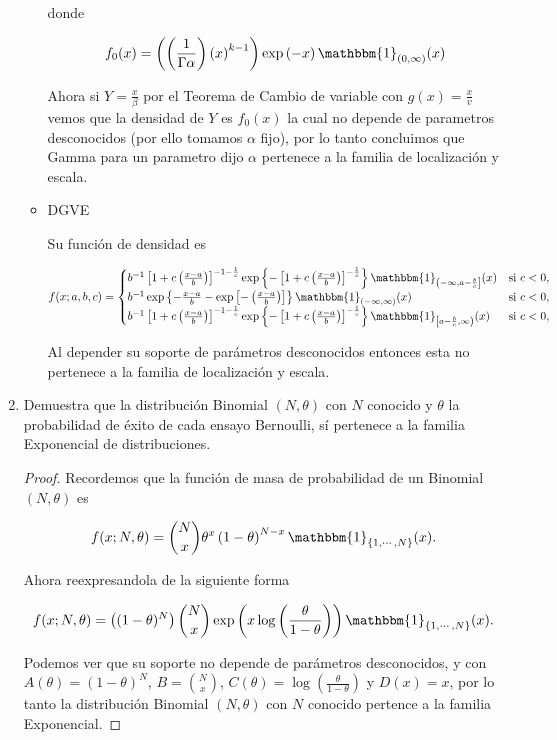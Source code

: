 \documentclass[letterpaper]{article}
\theoremstyle{definition}
\theoremstyle{lemathm}
\theoremstyle{lemathm}
\theoremstyle{lemathm}
\theoremstyle{lemademthm}
\newcommand{\pars}[1]{\left( #1 \right) }
\newcommand{\bracs}[1]{\left[ #1 \right] }
\newcommand{\set}[1]{\left \{ #1 \right\} }
\newcommand{\1}{\mathbbm{1}}
\begin{document}
\begin{enumerate}
\begin{itemize}
			donde

			\[f_0(x) = \pars{\pars{\frac{1}{\Gamma{\alpha}}}\pars{x}^{k-1}} \exp\pars{-x} \1_{(0,\infty)}(x)\]

			Ahora si $Y = \frac{x}{\beta}$ por el Teorema de Cambio de variable con $g(x) = \frac{x}{v}$ vemos que la densidad de $Y$ es $f_0(x)$ la cual no depende de parametros desconocidos (por ello tomamos $\alpha$ fijo), por lo tanto concluimos que Gamma para un parametro dijo $\alpha$ pertenece a la familia de localización y escala.

			\item DGVE
			
			Su función de densidad es 

			\[f(x; a,b,c) = \begin{cases}
				b^{-1}\bracs{1+c\pars{\frac{x-a}{b}}}^{-1-\frac{1}{c}}\exp\set{-\bracs{1+c\pars{\frac{x-a}{b}}}^{-\frac{1}{c}}}\1_{\left(-\infty,a-\frac{b}{c}\right]}(x) & \text{si } c < 0,\\
				b^{-1}\exp\set{-\frac{x-a}{b}-\exp\bracs{-\pars{\frac{x-a}{b}}}}\1_{\pars{-\infty,\infty}}(x) & \text{si } c < 0,\\
				b^{-1}\bracs{1+c\pars{\frac{x-a}{b}}}^{-1-\frac{1}{c}}\exp\set{-\bracs{1+c\pars{\frac{x-a}{b}}}^{-\frac{1}{c}}}\1_{\left[a-\frac{b}{c},\infty\right)}(x) & \text{si } c < 0,
			\end{cases}\]

			Al depender su soporte de parámetros desconocidos entonces esta no pertenece a la familia de localización y escala.
		\end{itemize}

		\item Demuestra que la distribución Binomial $(N,\theta)$ con $N$ conocido y $\theta$ la probabilidad de éxito de cada ensayo Bernoulli, sí pertenece a la familia Exponencial de distribuciones.
	
		\begin{proof}
			Recordemos que la función de masa de probabilidad de un Binomial $(N,\theta)$ es

			\[f(x; N,\theta) = \binom{N}{x} \theta^x \pars{1-\theta}^{N-x} \1_{\set{1,\cdots,N}}(x).\]

			Ahora reexpresandola de la siguiente forma

			\[f(x; N,\theta) = \pars{(1-\theta)^N}\binom{N}{x}\exp\pars{x\log\pars{\frac{\theta}{1-\theta}}}\1_{\set{1,\cdots,N}}(x).\]

			Podemos ver que su soporte no depende de parámetros desconocidos, y con $A(\theta) = \pars{1-\theta}^N$, $B = \binom{N}{x}$, $C(\theta) = \log\pars{\frac{\theta}{1-\theta}}$ y $D(x) = x$, por lo tanto la distribución Binomial $\pars{N,\theta}$ con $N$ conocido pertence a la familia Exponencial.
			

\end{proof}
\end{enumerate}
\end{document}
